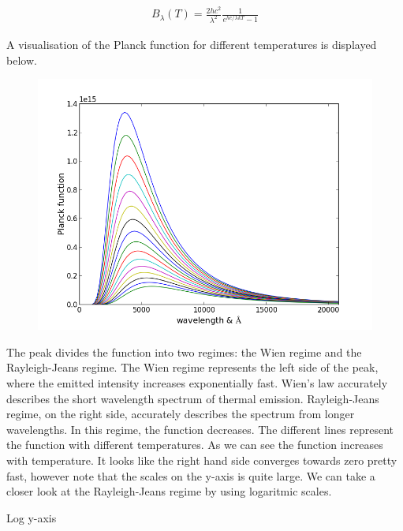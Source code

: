 \documentclass[norsk,a4paper,12pt]{article}
\begin{document}
\begin{align*}
B_{\lambda}(T) = \frac{2hc^2}{\lambda^2} \frac{1}{e^{hc/\lambda kT}-1}
\end{align*} 

A visualisation of the Planck function for different temperatures is displayed below.

\begin{figure}[H] 
\begin{center} 
\includegraphics[scale=0.5]{ssa31_1.png} 
 

\caption{} 
\end{center} 
\end{figure}



The peak divides the function into two regimes: the Wien regime and the Rayleigh-Jeans regime. 
The Wien regime represents the left side of the peak, where the emitted intensity increases exponentially fast.
Wien's law accurately describes the short wavelength spectrum of thermal emission.
Rayleigh-Jeans regime, on the right side, accurately describes the spectrum from longer wavelengths.
In this regime, the function decreases.
The different lines represent the function with different temperatures. As we can see the function increases with temperature. 
It looks like the right hand side converges towards zero pretty fast, however note that the scales on the y-axis
is quite large. We can take a closer look at the Rayleigh-Jeans regime by using logaritmic scales.

Log y-axis
\end{document}
